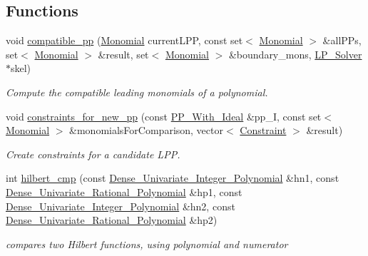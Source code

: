 \subsection*{Functions}
\begin{DoxyCompactItemize}
\item 
void \hyperlink{group___g_b_computation_gabe68a8de3b87f6cc69e64fff39b71a81}{compatible\+\_\+pp} (\hyperlink{group__polygroup_class_monomial}{Monomial} current\+L\+PP, const set$<$ \hyperlink{group__polygroup_class_monomial}{Monomial} $>$ \&all\+P\+Ps, set$<$ \hyperlink{group__polygroup_class_monomial}{Monomial} $>$ \&result, set$<$ \hyperlink{group__polygroup_class_monomial}{Monomial} $>$ \&boundary\+\_\+mons, \hyperlink{group___c_l_s_solvers_class_l_p___solvers_1_1_l_p___solver}{L\+P\+\_\+\+Solver} $\ast$skel)
\begin{DoxyCompactList}\small\item\em Compute the compatible leading monomials of a polynomial. \end{DoxyCompactList}\item 
void \hyperlink{group___g_b_computation_gaf0ec0ad4f8430c46fc90c16104020f16}{constraints\+\_\+for\+\_\+new\+\_\+pp} (const \hyperlink{group___g_b_computation_class_dynamic___engine_1_1_p_p___with___ideal}{P\+P\+\_\+\+With\+\_\+\+Ideal} \&pp\+\_\+I, const set$<$ \hyperlink{group__polygroup_class_monomial}{Monomial} $>$ \&monomials\+For\+Comparison, vector$<$ \hyperlink{group___c_l_s_solvers_class_l_p___solvers_1_1_constraint}{Constraint} $>$ \&result)
\begin{DoxyCompactList}\small\item\em Create constraints for a candidate L\+PP. \end{DoxyCompactList}\item 
int \hyperlink{group___g_b_computation_ga9be1af3b4560bec7a8f17c5716e33ee7}{hilbert\+\_\+cmp} (const \hyperlink{group__polygroup_class_dense___univariate___integer___polynomial}{Dense\+\_\+\+Univariate\+\_\+\+Integer\+\_\+\+Polynomial} \&hn1, const \hyperlink{group__polygroup_class_dense___univariate___rational___polynomial}{Dense\+\_\+\+Univariate\+\_\+\+Rational\+\_\+\+Polynomial} \&hp1, const \hyperlink{group__polygroup_class_dense___univariate___integer___polynomial}{Dense\+\_\+\+Univariate\+\_\+\+Integer\+\_\+\+Polynomial} \&hn2, const \hyperlink{group__polygroup_class_dense___univariate___rational___polynomial}{Dense\+\_\+\+Univariate\+\_\+\+Rational\+\_\+\+Polynomial} \&hp2)
\begin{DoxyCompactList}\small\item\em compares two Hilbert functions, using polynomial and numerator \end{DoxyCompactList}\item 

\end{DoxyCompactItemize}
